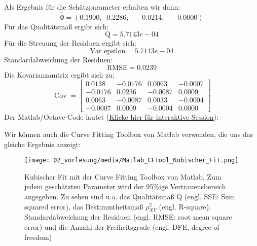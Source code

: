 Als Ergebnis für die Schätzparameter erhalten wir dann:
\[\hat{\boldsymbol\theta} =
(0.1900, \;\; 0.2286,\;\; -0.0214, \;\; -0.0000) \]
Für das Qualitätsmaß ergibt sich:
\[\mathrm{Q} = 5.7143e-04 \]
Für die Streuung der Residuen ergibt sich:
\[\mathrm{Var\_epsilon} = 5.7143e-04 \]
Standardabweichung der Residuen:
\[
\mathrm{RMSE} = 0.0239 \]
Die Kovarianzamtrix ergibt sich zu:
\[
\operatorname{Cov} =
\begin{bmatrix}
0.0138  & -0.0176  &  0.0063  & -0.0007 \\
-0.0176 &   0.0236 &  -0.0087 &  0.0009 \\
0.0063  &  -0.0087 &   0.0033 &  -0.0004 \\
-0.0007 &   0.0009 &  -0.0004  &  0.0000
\end{bmatrix}
\]
Der Matlab/Octave-Code lautet (\href{https://mybinder.org/v2/gh/dhueser/MDA-Vorlesung-iprom-tu-bs/master?urlpath=/lab/tree/vorlesung/02_vorlesung/code/cubic_fit.ipynb}{Klicke hier für interaktive Session}):


Wir können auch die Curve Fitting Toolbox von Matlab
verwenden, die uns das gleiche Ergebnis anzeigt:
\begin{figure}[!htp]
	\begin{center}
		\texttt{[image: 02\_vorlesung/media/Matlab\_CFTool\_Kubischer\_Fit.png]}
		\caption{Kubischer Fit mit der Curve Fitting Toolbox von Matlab.
			Zum jedem geschätzten Parameter wird der 95\%ige Vertrauensbereich
			angegeben. Zu sehen sind u.a. das Qualitätsmaß Q (engl. SSE: Sum squared error), das Bestimmtheitsmaß $\rho^2_{XY}$ (engl. R-square), Standardabweichung der Residuen (engl. RMSE: root mean square error) und die Anzahl der Freiheitsgrade (engl. DFE, degree of freedom)}
		\label{fig:CFTool_kubischerFit}
	\end{center}
\end{figure}
\newpage


